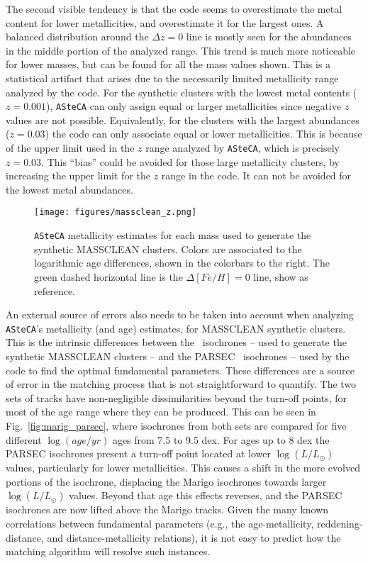 \documentclass{aa}
\begin{document}
\begin{appendix}
The second visible tendency is that the code seems to overestimate the metal
content for lower metallicities, and overestimate it for the largest ones.
A balanced distribution around the $\Delta z{=}0$ line is mostly seen for the
abundances in the middle portion of the analyzed range. This trend is much more
noticeable for lower masses, but can be found for all the mass values shown.
%
This is a statistical artifact that arises due to the necessarily limited
metallicity range analyzed by the code. For the synthetic clusters with the
lowest metal contents ($z{=}0.001$), \texttt{ASteCA} can only assign equal or
larger metallicities since negative $z$ values are not possible.
Equivalently, for the clusters with the largest abundances ($z{=}0.03$) the code
can only associate equal or lower metallicities. This is because of the upper
limit used in the $z$ range analyzed by \texttt{ASteCA}, which is precisely
$z{=}0.03$.
This ``bias'' could be avoided for those large metallicity clusters, by
increasing the upper limit for the $z$ range in the code. It can not be avoided
for the lowest metal abundances.\\

\begin{figure*}
\texttt{[image: figures/massclean\_z.png]}
\caption{\texttt{ASteCA} metallicity estimates for each mass used to generate
the synthetic MASSCLEAN clusters. Colors are associated to the logarithmic age
differences, shown in the colorbars to the right. The green dashed horizontal
line is the $\Delta[Fe/H]{=}0$ line, show as reference.}
\label{fig:massclean_z}
\end{figure*}

An external source of errors also needs to be taken into account when analyzing
\texttt{ASteCA}'s metallicity (and age) estimates, for MASSCLEAN synthetic
clusters.
%
This is the intrinsic differences between the~\cite{Marigo_2008} isochrones --
used to generate the synthetic MASSCLEAN clusters -- and the
PARSEC~\citep{Bressan_2012} isochrones -- used by the code to find the optimal
fundamental parameters. These differences are a source of error in the matching
process that is not straightforward to quantify.
%
The two sets of tracks have non-negligible dissimilarities beyond the turn-off
points, for most of the age range where they can be produced. This can be seen
in Fig.~\ref{fig:marig_parsec}, where isochrones from both sets are compared for
five different $\log(age/yr)$ ages from 7.5 to 9.5 dex.
%
For ages up to 8 dex the PARSEC isochrones present a turn-off point located at
lower $\log(L/L_{\odot})$ values, particularly for lower metallicities. This
causes a shift in the more evolved portions of the isochrone, displacing the
Marigo isochrones towards larger $\log(L/L_{\odot})$ values.
%
Beyond that age this effects reverses, and the PARSEC isochrones are now lifted
above the Marigo tracks. Given the many known correlations between fundamental
parameters (e.g., the age-metallicity, reddening-distance, and
distance-metallicity relations), it is not easy to predict how the matching
algorithm will resolve such instances.


\end{appendix}
\end{document}
